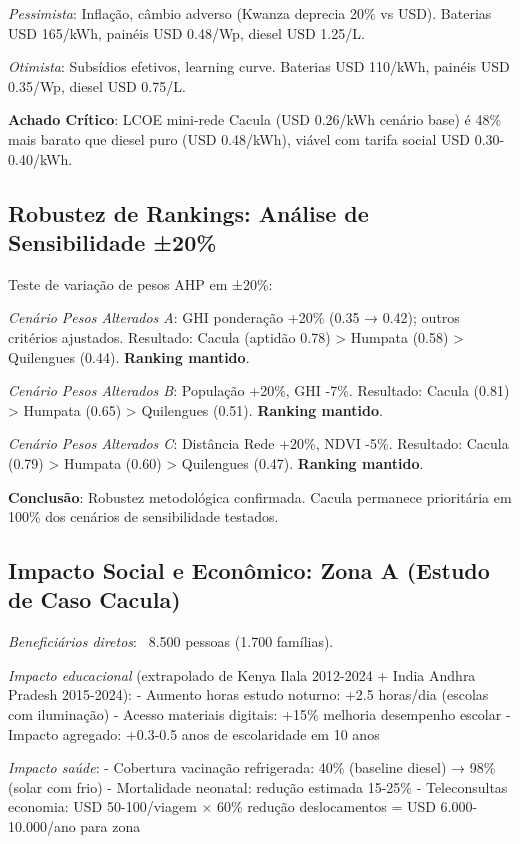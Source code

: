\documentclass[12pt, a4paper]{article}
\begin{document}
{{{{{{{{{{{\textit{Pessimista}: Inflação, câmbio adverso (Kwanza deprecia 20\% vs USD). Baterias USD 165/kWh, painéis USD 0.48/Wp, diesel USD 1.25/L.

\textit{Otimista}: Subsídios efetivos, learning curve. Baterias USD 110/kWh, painéis USD 0.35/Wp, diesel USD 0.75/L.

\textbf{Achado Crítico}: LCOE mini-rede Cacula (USD 0.26/kWh cenário base) é 48\% mais barato que diesel puro (USD 0.48/kWh), viável com tarifa social USD 0.30-0.40/kWh.

\subsection{Robustez de Rankings: Análise de Sensibilidade ±20\%}

Teste de variação de pesos AHP em ±20\%:

\textit{Cenário Pesos Alterados A}: GHI ponderação +20\% (0.35 → 0.42); outros critérios ajustados.
Resultado: Cacula (aptidão 0.78) > Humpata (0.58) > Quilengues (0.44). \textbf{Ranking mantido}.

\textit{Cenário Pesos Alterados B}: População +20\%, GHI -7\%.
Resultado: Cacula (0.81) > Humpata (0.65) > Quilengues (0.51). \textbf{Ranking mantido}.

\textit{Cenário Pesos Alterados C}: Distância Rede +20\%, NDVI -5\%.
Resultado: Cacula (0.79) > Humpata (0.60) > Quilengues (0.47). \textbf{Ranking mantido}.

\textbf{Conclusão}: Robustez metodológica confirmada. Cacula permanece prioritária em 100\% dos cenários de sensibilidade testados.

\subsection{Impacto Social e Econômico: Zona A (Estudo de Caso Cacula)}

\textit{Beneficiários diretos}: ~8.500 pessoas (1.700 famílias).

\textit{Impacto educacional} (extrapolado de Kenya Ilala 2012-2024 + India Andhra Pradesh 2015-2024):
- Aumento horas estudo noturno: +2.5 horas/dia (escolas com iluminação)
- Acesso materiais digitais: +15\% melhoria desempenho escolar
- Impacto agregado: +0.3-0.5 anos de escolaridade em 10 anos

\textit{Impacto saúde}:
- Cobertura vacinação refrigerada: 40\% (baseline diesel) → 98\% (solar com frio)
- Mortalidade neonatal: redução estimada 15-25\%
- Teleconsultas economia: USD 50-100/viagem × 60\% redução deslocamentos = USD 6.000-10.000/ano para zona

}}}}}}}}}}}
\end{document}
